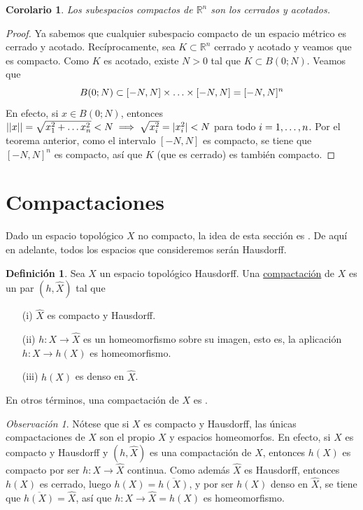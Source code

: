 \documentclass[12pt]{report}
\newtheorem{corollary}{Corolario}[chapter]
\theoremstyle{definition}
\newtheorem{definition}{Definición}[chapter]
\theoremstyle{definition}
\theoremstyle{remark}
\newtheorem*{obs}{Observación} %
\newcommand{\R}{\mathbb R}
\begin{document}
\begin{corollary}
Los subespacios compactos de $\R^n$ son los cerrados y acotados.
\end{corollary}

\begin{proof}
Ya sabemos que cualquier subespacio compacto de un espacio métrico es cerrado y acotado. Recíprocamente, sea $K \subset \R^n$ cerrado y acotado y veamos que es compacto. Como $K$ es acotado, existe $N > 0$ tal que $K \subset B(0;N)$. Veamos que 
\[B(0;N) \subset [-N,N] \times \mathellipsis \times [-N,N] = [-N,N]^n\]
En efecto, si $x \in B(0;N)$, entonces $||x|| = \sqrt{x_1^2 + \mathellipsis x_n^2} < N \implies \sqrt{x_i^2} = |x_i^2| < N$ para todo $i = 1,\mathellipsis,n$. Por el teorema anterior, como el intervalo $[-N,N]$ es compacto, se tiene que $[-N,N]^n$ es compacto, así que $K$ (que es cerrado) es también compacto.
\end{proof}

\section{Compactaciones}
Dado un espacio topológico $X$ no compacto, la idea de esta sección es . De aquí en adelante, todos los espacios que consideremos serán Hausdorff.

\begin{definition}
Sea $X$ un espacio topológico Hausdorff. Una \underline{compactación} de $X$ es un par $(h,\hat{X})$ tal que
\begin{itemize}
    \item[(i)] $\hat{X}$ es compacto y Hausdorff.
    \item[(ii)] $h \colon X \to \hat{X}$ es un homeomorfismo sobre su imagen, esto es, la aplicación $h \colon X \to h(X)$ es homeomorfismo.
    \item[(iii)] $h(X)$ es denso en $\hat{X}$.
\end{itemize}
En otros términos, una compactación de $X$ es .
\end{definition}

\begin{obs}
Nótese que si $X$ es compacto y Hausdorff, las únicas compactaciones de $X$ son el propio $X$ y espacios homeomorfos. En efecto, si $X$ es compacto y Hausdorff y $(h,\hat{X})$ es una compactación de $X$, entonces $h(X)$ es compacto por ser $h \colon X \to \hat{X}$ continua. Como además $\hat{X}$ es Hausdorff, entonces $h(X)$ es cerrado, luego $h(X) = \overline{h(X)}$, y por ser $h(X)$ denso en $\hat{X}$, se tiene que $\overline{h(X)} = \hat{X}$, así que $h \colon X \to \hat{X} = h(X)$ es homeomorfismo.
\end{obs}
\end{document}
